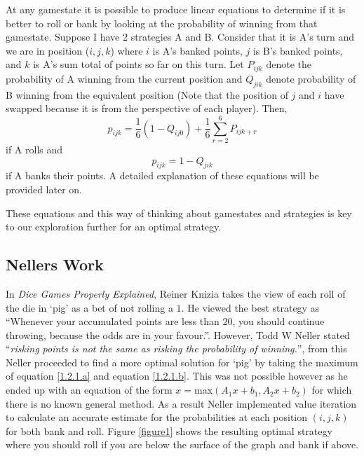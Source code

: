 \documentclass[a4paper,titlepage]{article}
\begin{document}
At any gamestate it is possible to produce linear equations to determine if it is better to roll or bank by looking at the probability of winning from that gamestate.
Suppose I have 2 strategies A and B. Consider that it is A's turn and we are in position ($i,j,k$) where $i$ is A's banked points,
$j$ is B's banked points, and $k$ is A's sum total of points so far on this turn. Let $P_{ijk}$ denote the probability of A winning
from the current position and $Q_{jik}$ denote probability of B winning from the equivalent position (Note that the position of $j$ and $i$ have swapped because it is
from the perspective of each player). Then,
\begin{equation}\label{1.2.1.a}
p_{ijk} = \dfrac{1}{6} (1-Q_{ij0}) + \dfrac{1}{6}\sum^{6}_{r=2}P_{ijk+r}
\end{equation}
 if A rolls and
 \begin{equation}\label{1.2.1.b}
 p_{ijk} = 1-Q_{jik}
 \end{equation}
 if A banks their points. A detailed explanation of these equations will be provided later on.

 These equations and this way of thinking about gamestates and strategies is key to our exploration further for an optimal strategy.

\subsection{Nellers Work}
In \textit{Dice Games Properly Explained}, Reiner Knizia takes the view of each roll of the die in `pig' as a bet of not rolling a $1$.
He viewed the best strategy as ``Whenever your accumulated points are less than 20, you should continue throwing, because the odds are in your favour.''\cite{knizia2010dice}.
However, Todd W Neller stated ``\textit{risking points is not the same as risking the probability of winning.}''\cite{neller2004optimal},
from this Neller proceeded to find a more optimal solution for `pig' by taking the maximum of equation \ref{1.2.1.a} and equation \ref{1.2.1.b}.
This was not possible however as he ended up with an equation of the form $x=$max$ (A_1 x+b_1,A_2 x+b_2)$ for which there is no known general method.
As a result Neller implemented value iteration to calculate an accurate estimate for the probabilities at each position $(i,j,k)$ for both bank and roll.
Figure \ref{figure1} shows the resulting optimal strategy where you should roll if you are below the surface of the graph and bank if above.
\end{document}
